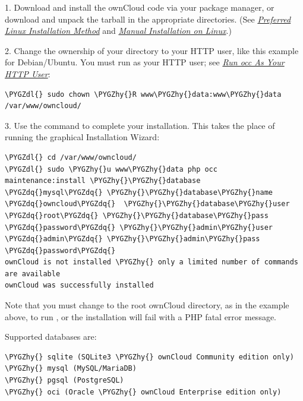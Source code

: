 \documentclass[letterpaper,10pt,english]{sphinxmanual}
\def\PYGZdl{\char`\$}
\def\PYGZhy{\char`\-}
\def\PYGZdq{\char`\"}
\begin{document}
1. Download and install the ownCloud code via your package manager, or download
and unpack the tarball in the appropriate directories. (See
{\hyperref[installation/linux_installation::doc]{\emph{Preferred Linux Installation Method}}} and {\hyperref[installation/source_installation::doc]{\emph{Manual Installation on Linux}}}.)

2. Change the ownership of your  directory to your HTTP user, like
this example for Debian/Ubuntu. You must run  as your HTTP user; see
{\hyperref[configuration_server/occ_command:http-user-label]{\emph{Run occ As Your HTTP User}}}:

\begin{Verbatim}[commandchars=\\\{\}]
\PYGZdl{} sudo chown \PYGZhy{}R www\PYGZhy{}data:www\PYGZhy{}data /var/www/owncloud/
\end{Verbatim}

3. Use the  command to complete your installation. This takes the place
of running the graphical Installation Wizard:

\begin{Verbatim}[commandchars=\\\{\}]
\PYGZdl{} cd /var/www/owncloud/
\PYGZdl{} sudo \PYGZhy{}u www\PYGZhy{}data php occ  maintenance:install \PYGZhy{}\PYGZhy{}database
\PYGZdq{}mysql\PYGZdq{} \PYGZhy{}\PYGZhy{}database\PYGZhy{}name \PYGZdq{}owncloud\PYGZdq{}  \PYGZhy{}\PYGZhy{}database\PYGZhy{}user \PYGZdq{}root\PYGZdq{} \PYGZhy{}\PYGZhy{}database\PYGZhy{}pass
\PYGZdq{}password\PYGZdq{} \PYGZhy{}\PYGZhy{}admin\PYGZhy{}user \PYGZdq{}admin\PYGZdq{} \PYGZhy{}\PYGZhy{}admin\PYGZhy{}pass \PYGZdq{}password\PYGZdq{}
ownCloud is not installed \PYGZhy{} only a limited number of commands are available
ownCloud was successfully installed
\end{Verbatim}

Note that you must change to the root ownCloud directory, as in the example
above, to run , or the installation will fail with
a PHP fatal error message.

Supported databases are:

\begin{Verbatim}[commandchars=\\\{\}]
\PYGZhy{} sqlite (SQLite3 \PYGZhy{} ownCloud Community edition only)
\PYGZhy{} mysql (MySQL/MariaDB)
\PYGZhy{} pgsql (PostgreSQL)
\PYGZhy{} oci (Oracle \PYGZhy{} ownCloud Enterprise edition only)
\end{Verbatim}
\end{document}
